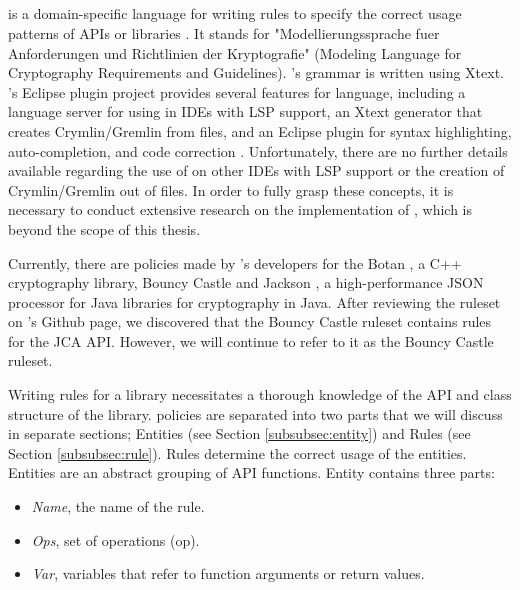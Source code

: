 \subsection{\MARK{}}
\label{subsec:mark}
\MARK{} is a domain-specific language for writing rules to specify the correct usage patterns of APIs or libraries \cite{cod}. It stands for "Modellierungssprache fuer Anforderungen und Richtlinien der Kryptografie" (Modeling Language for Cryptography Requirements and Guidelines). \MARK{}'s grammar is written using Xtext. \MARK{}'s Eclipse plugin project \cite{markgithub} provides several features for \MARK{} language, including a language server for using \MARK{} in IDEs with LSP support, an Xtext generator that creates Crymlin/Gremlin from \MARK{} files, and an Eclipse plugin for syntax highlighting, auto-completion, and code correction \cite{markgithub}. Unfortunately, there are no further details available regarding the use of \MARK{} on other IDEs with LSP support or the creation of Crymlin/Gremlin out of \MARK{} files. In order to fully grasp these concepts, it is necessary to conduct extensive research on the implementation of \MARK{}, which is beyond the scope of this thesis.

Currently, there are \MARK{} policies made by \codyze's developers for the Botan \cite{botan}, a C++ cryptography library, Bouncy Castle and Jackson \cite{jackson}, a high-performance JSON processor for Java libraries for cryptography in Java. After reviewing the \MARK{} ruleset on \codyze's Github page, we discovered that the Bouncy Castle \MARK{} ruleset contains rules for the JCA API. However, we will continue to refer to it as the Bouncy Castle \MARK{} ruleset.

Writing \MARK{} rules for a library necessitates a thorough knowledge of the API and class structure of the library. \MARK{} policies are separated into two parts that we will discuss in separate sections; Entities (see Section \ref{subsubsec:entity}) and Rules (see Section \ref{subsubsec:rule}). Rules determine the correct usage of the entities. Entities are an abstract grouping of API functions. Entity contains three parts:
\begin{itemize}
\item \emph{Name}, the name of the rule.
\item \emph{Ops}, set of operations (op).
\item \emph{Var}, variables that refer to function arguments or return values.
\end{itemize}


